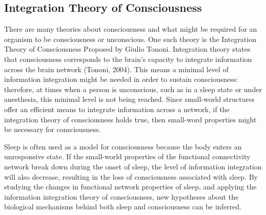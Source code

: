 \documentclass[11pt,letterpaper,doublespacing,titlepage]{article}
\begin{document}
\subsection{Integration Theory of Consciousness}
\par
There are many theories about consciousness and what might be required for an organism to be consciousness or unconscious. One such theory is the Integration Theory of Consciousness Proposed by Giulio Tononi. Integration theory states that consciousness corresponds to the brain's capacity to integrate information across the brain network (Tononi, 2004). This means a minimal level of information integration might be needed in order to sustain consciousness: therefore, at times when a person is unconscious, such as in a sleep state or under anesthesia, this minimal level is not being reached. Since small-world structures offer an efficient means to integrate information across a network, if the integration theory of consciousness holds true, then small-word properties might be necessary for consciousness.
\par
Sleep is often used as a model for consciousness because the body enters an unresponsive state. If the small-world properties of the functional connectivity network break down during the onset of sleep, the level of information integration will also decrease, resulting in the loss of consciousness associated with sleep. By studying the changes in functional network properties of sleep, and applying the information integration theory of consciousness, new hypotheses about the biological mechanisms behind both sleep and consciousness can be inferred.
\end{document}
